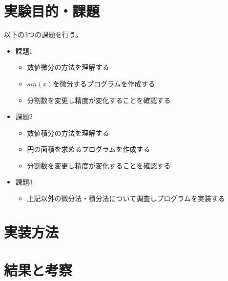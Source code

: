 \documentclass[dvipdfmx]{jsarticle}
\begin{document}
\section{実験目的・課題}
以下の3つの課題を行う。
\begin{itemize}
  \item 課題1
  \begin{itemize}
    \item 数値微分の方法を理解する
    \item $sin(x)$を微分するプログラムを作成する
    \item 分割数を変更し精度が変化することを確認する
  \end{itemize}
  \item 課題2
  \begin{itemize}
    \item 数値積分の方法を理解する
    \item 円の面積を求めるプログラムを作成する
    \item 分割数を変更し精度が変化することを確認する
  \end{itemize}
  \item 課題3
  \begin{itemize}
    \item 上記以外の微分法・積分法について調査しプログラムを実装する
  \end{itemize}
\end{itemize}

\section{実装方法}

\section{結果と考察}

\begin{thebibliography}{10}
  
  \url{}
\end{thebibliography}
\end{document}
